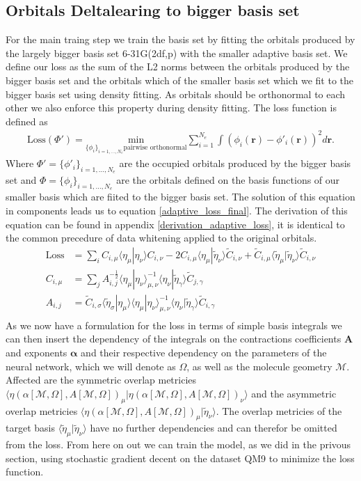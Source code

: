 \subsection{Orbitals Deltalearing to bigger basis set}
For the main traing step we train the basis set by fitting the orbitals produced by the largely bigger basis set 6-31G(2df,p) with the smaller adaptive basis set.
We define our loss as the sum of the L2 norms between the orbitals produced by the bigger basis set and the orbitals which of the smaller basis set which we fit to the bigger basis set using density fitting. As orbitals should be orthonormal to each other we also enforce this property during density fitting. The loss function is defined as
\begin{align}
    \text{Loss}(\Phi') = \underset{\{\phi_i\}_{i=1,...,N_e} \text{pairwise orthonormal}}{\text{min}}\sum\limits_{i=1}^{N_e} \int (\phi_i(\mathbf{r})-\phi'_i(\mathbf{r}))^2 d\mathbf{r}.
\end{align}
Where $\Phi' = \{\phi'_i\}_{i=1,...,N_e}$ are the occupied orbitals produced by the bigger basis set and $\Phi = \{\phi_i\}_{i=1,...,N_e}$ are the orbitals defined on the basis functions of our smaller basis  which are fiited to the bigger basis set. The solution of this equation in components leads us to equation \eqref{adaptive_loss_final}.
The derivation of this equation can be found in appendix \ref{derivation_adaptive_loss}, it is identical to the common precedure of data whitening applied to the original orbitals.
\begin{align}\label{adaptive_loss_final}
    \text{Loss} &= \sum_i C_{i,\mu} \langle\eta_\mu|\eta_\nu\rangle C_{i,\nu} - 2 C_{i,\mu} \langle\eta_\mu|\tilde\eta_\nu\rangle \tilde C_{i,\nu} + \tilde C_{i,\mu} \langle\tilde \eta_\mu|\tilde \eta_\nu\rangle \tilde C_{i,\nu}\\
     C_{i,\mu}&= \sum_{j} A^{-\frac{1}{2}}_{i,j} \langle\eta_\mu|\eta_\nu\rangle^{-1}_{\mu,\nu} \langle\eta_\nu|\tilde\eta_\gamma\rangle \tilde C_{j,\gamma}\\
    A_{i,j}&=\tilde C_{i,\sigma}\langle\tilde \eta_\sigma|\eta_\mu\rangle \langle\eta_\mu|\eta_\nu\rangle^{-1}_{\mu,\nu} \langle\eta_\nu|\tilde\eta_\gamma\rangle \tilde C_{i,\gamma}\\
\end{align}
As we now have a formulation for the loss in terms of simple basis integrals we can then insert the dependency of the integrals on the contractions coefficients $\mathbf{A}$ and exponents $\mathbf{\alpha}$ and their respective dependency on the parameters of the neural network, which we will denote as $\Omega$, as well as the molecule geometry $\mathcal{M}$. Affected are the symmetric overlap metricies $\langle\eta(\alpha[\mathcal{M},\Omega],A[\mathcal{M},\Omega])_\mu|\eta(\alpha[\mathcal{M},\Omega],A[\mathcal{M},\Omega])_\nu\rangle$ and the asymmetric overlap metricies $\langle\eta(\alpha[\mathcal{M},\Omega],A[\mathcal{M},\Omega])_\mu|\tilde\eta_\nu\rangle$. The overlap metricies of the target basis $\langle\tilde \eta_\mu|\tilde \eta_\nu\rangle$ have no further dependencies and can therefor be omitted from the loss. From here on out we can train the model, as we did in the privous section, using stochastic gradient decent on the dataset QM9 to minimize the loss function.
